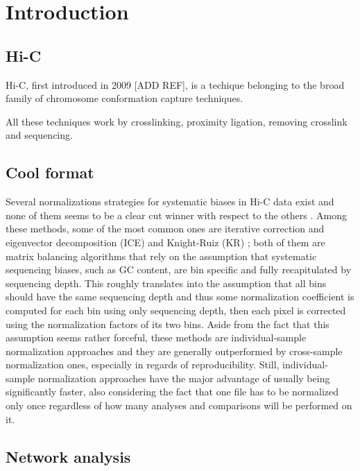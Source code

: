 \graphicspath{{chapters/02_introduction/images}}
\chapter{Introduction}


\section{Hi-C}
Hi-C, first introduced in 2009 [ADD REF], is a techique belonging to the broad family of chromosome conformation capture techniques. 

All these techniques work by crosslinking, proximity ligation, removing crosslink and sequencing.


\section{Cool format}


Several normalizations strategies for systematic biases in Hi-C data exist and none of them seems to be a clear cut winner with respect to the others \cite{normalization2020}. Among these methods, some of the most common ones are iterative correction and eigenvector decomposition (ICE) \cite{ice2012} and Knight-Ruiz (KR) \cite{knightruiz2012}; both of them are matrix balancing algorithms that rely on the assumption that systematic sequencing biases, such as GC content, are bin specific and fully recapitulated by sequencing depth. This roughly translates into the assumption that all bins should have the same sequencing depth and thus some normalization coefficient is computed for each bin using only sequencing depth, then each pixel is corrected using the normalization factors of its two bins. Aside from the fact that this assumption seems rather forceful, these methods are individual-sample normalization approaches and they are generally outperformed by cross-sample normalization ones, especially in regards of reproducibility. Still, individual-sample normalization approaches have the major advantage of usually being significantly faster, also considering the fact that one file has to be normalized only once regardless of how many analyses and comparisons will be performed on it. 

\section{Network analysis}

